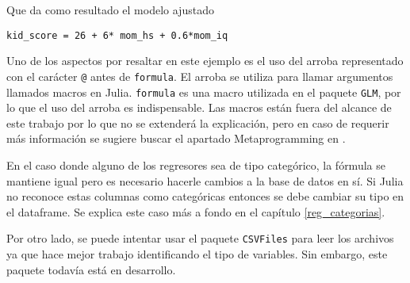 Que da como resultado el modelo ajustado

\texttt{kid\_score = 26 + 6* mom\_hs + 0.6*mom\_iq}

Uno de los aspectos por resaltar en este ejemplo es el uso del arroba representado con el carácter \texttt{@} antes de \texttt{formula}. El arroba se utiliza para llamar argumentos llamados macros en \textsf{Julia}. \texttt{formula} es una macro utilizada en el paquete \texttt{GLM}, por lo que el uso del arroba es indispensable. Las macros están fuera del alcance de este trabajo por lo que no se extenderá la explicación, pero en caso de requerir más información se sugiere buscar el apartado \textsf{Metaprogramming} en \cite{manual_Julia}. 

En el caso donde alguno de los regresores sea de tipo categórico, la fórmula se mantiene igual pero es necesario hacerle cambios a la base de datos en sí. Si \textsf{Julia} no reconoce estas columnas como categóricas entonces se debe cambiar su tipo en el dataframe. Se explica este caso más a fondo en el capítulo \ref{reg_categorias}. 

Por otro lado, se puede intentar usar el paquete \texttt{CSVFiles} para leer los archivos ya que hace mejor trabajo identificando el tipo de variables. Sin embargo, este paquete todavía está en desarrollo. 
